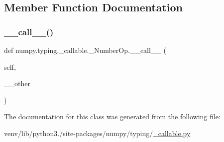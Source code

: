\subsection{Member Function Documentation}
\mbox{\label{classnumpy_1_1typing_1_1__callable_1_1__NumberOp_aa31d9b48f728b08cf4c1f0a38c9e399b}} 
\subsubsection{\texorpdfstring{\+\_\+\+\_\+call\+\_\+\+\_\+()}{\_\_call\_\_()}}
{\footnotesize\ttfamily def numpy.\+typing.\+\_\+callable.\+\_\+\+Number\+Op.\+\_\+\+\_\+call\+\_\+\+\_\+ (\begin{DoxyParamCaption}\item[{}]{self,  }\item[{}]{\+\_\+\+\_\+other }\end{DoxyParamCaption})}



The documentation for this class was generated from the following file\+:\begin{DoxyCompactItemize}
\item 
venv/lib/python3./site-\/packages/numpy/typing/\hyperlink{__callable_8py}{\+\_\+callable.\+py}\end{DoxyCompactItemize}
